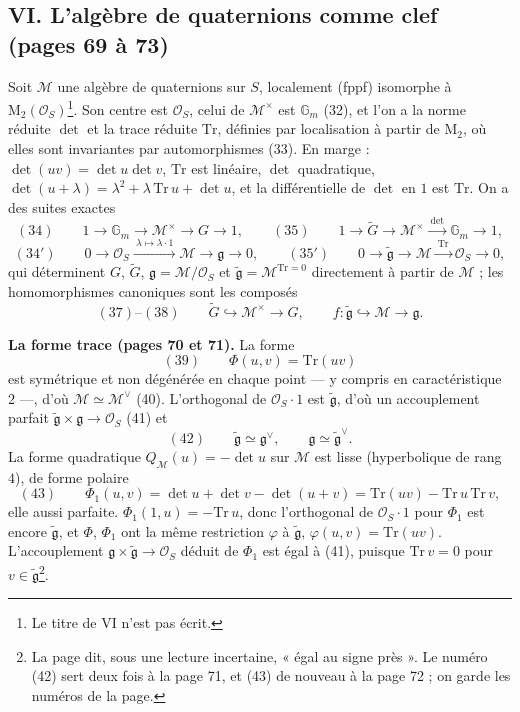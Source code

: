 \documentclass[11pt,a4paper]{article}
\begin{document}
\subsection*{VI. L'algèbre de quaternions comme clef (pages 69 à 73)}

Soit $\mathcal{M}$ une algèbre de quaternions sur $S$, localement (fppf) isomorphe à
$\mathrm{M}_2(\mathcal{O}_S)$\footnote{Le titre de VI n'est pas écrit.}. Son centre est
$\mathcal{O}_S$, celui de $\mathcal{M}^{\times}$ est $\mathbb{G}_m$ (32), et l'on a la norme
réduite $\det$ et la trace réduite $\mathrm{Tr}$, définies par localisation à partir de
$\mathrm{M}_2$, où elles sont invariantes par automorphismes (33). En marge :
$\det(uv) = \det u \det v$, $\mathrm{Tr}$ est linéaire, $\det$ quadratique,
$\det(u + \lambda) = \lambda^2 + \lambda\,\mathrm{Tr}\,u + \det u$, et la différentielle de
$\det$ en $1$ est $\mathrm{Tr}$. On a des suites exactes
\[
  (34) \qquad 1 \to \mathbb{G}_m \to \mathcal{M}^{\times} \to G \to 1 , \qquad
  (35) \qquad 1 \to \widetilde{G} \to \mathcal{M}^{\times} \xrightarrow{\ \det\ } \mathbb{G}_m \to 1 ,
\]
\[
  (34') \qquad 0 \to \mathcal{O}_S \xrightarrow{\ \lambda \mapsto \lambda\cdot 1\ } \mathcal{M} \to \mathfrak{g} \to 0 , \qquad
  (35') \qquad 0 \to \widetilde{\mathfrak{g}} \to \mathcal{M} \xrightarrow{\ \mathrm{Tr}\ } \mathcal{O}_S \to 0 ,
\]
qui déterminent $G$, $\widetilde{G}$, $\mathfrak{g} = \mathcal{M}/\mathcal{O}_S$ et
$\widetilde{\mathfrak{g}} = \mathcal{M}^{\mathrm{Tr} = 0}$ directement à partir de $\mathcal{M}$ ; les
homomorphismes canoniques sont les composés
\[
  (37)\text{--}(38) \qquad \widetilde{G} \hookrightarrow \mathcal{M}^{\times} \to G , \qquad
  f : \widetilde{\mathfrak{g}} \hookrightarrow \mathcal{M} \to \mathfrak{g} .
\]

\textbf{La forme trace (pages 70 et 71).} La forme
\[
  (39) \qquad \Phi(u, v) = \mathrm{Tr}(uv)
\]
est symétrique et non dégénérée en chaque point — y compris en caractéristique
$2$ —, d'où $\mathcal{M} \simeq \mathcal{M}^{\vee}$ (40). L'orthogonal de $\mathcal{O}_S\cdot 1$ est
$\widetilde{\mathfrak{g}}$, d'où un accouplement parfait
$\widetilde{\mathfrak{g}} \times \mathfrak{g} \to \mathcal{O}_S$ (41) et
\[
  (42) \qquad \widetilde{\mathfrak{g}} \simeq \mathfrak{g}^{\vee} , \qquad \mathfrak{g} \simeq \widetilde{\mathfrak{g}}^{\vee} .
\]
La forme quadratique $Q_{\mathcal{M}}(u) = -\det u$ sur $\mathcal{M}$ est lisse (hyperbolique de
rang $4$), de forme polaire
\[
  (43) \qquad \Phi_1(u, v) = \det u + \det v - \det(u + v) = \mathrm{Tr}(uv) - \mathrm{Tr}\,u\,\mathrm{Tr}\,v ,
\]
elle aussi parfaite. $\Phi_1(1, u) = -\mathrm{Tr}\,u$, donc l'orthogonal de
$\mathcal{O}_S\cdot 1$ pour $\Phi_1$ est encore $\widetilde{\mathfrak{g}}$, et $\Phi$, $\Phi_1$
ont la même restriction $\varphi$ à $\widetilde{\mathfrak{g}}$,
$\varphi(u, v) = \mathrm{Tr}(uv)$. L'accouplement
$\mathfrak{g} \times \widetilde{\mathfrak{g}} \to \mathcal{O}_S$ déduit de $\Phi_1$ est égal à (41),
puisque $\mathrm{Tr}\,v = 0$ pour $v \in \widetilde{\mathfrak{g}}$\footnote{La page dit, sous
une lecture incertaine, « égal au signe près ». Le numéro (42) sert deux fois à
la page 71, et (43) de nouveau à la page 72 ; on garde les numéros de la page.}.
\end{document}
